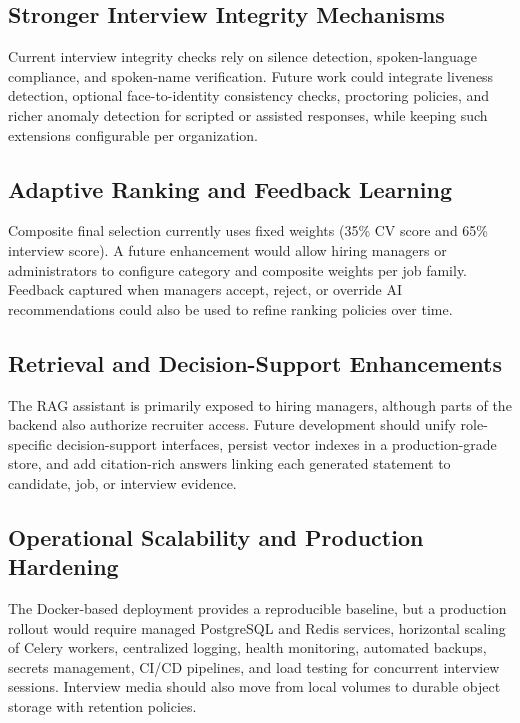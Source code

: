 \subsection{Stronger Interview Integrity Mechanisms}

Current interview integrity checks rely on silence detection, spoken-language compliance, and spoken-name verification. Future work could integrate liveness detection, optional face-to-identity consistency checks, proctoring policies, and richer anomaly detection for scripted or assisted responses, while keeping such extensions configurable per organization.

\subsection{Adaptive Ranking and Feedback Learning}

Composite final selection currently uses fixed weights (35\% CV score and 65\% interview score). A future enhancement would allow hiring managers or administrators to configure category and composite weights per job family. Feedback captured when managers accept, reject, or override AI recommendations could also be used to refine ranking policies over time.

\subsection{Retrieval and Decision-Support Enhancements}

The RAG assistant is primarily exposed to hiring managers, although parts of the backend also authorize recruiter access. Future development should unify role-specific decision-support interfaces, persist vector indexes in a production-grade store, and add citation-rich answers linking each generated statement to candidate, job, or interview evidence.

\subsection{Operational Scalability and Production Hardening}

The Docker-based deployment provides a reproducible baseline, but a production rollout would require managed PostgreSQL and Redis services, horizontal scaling of Celery workers, centralized logging, health monitoring, automated backups, secrets management, CI/CD pipelines, and load testing for concurrent interview sessions. Interview media should also move from local volumes to durable object storage with retention policies.

